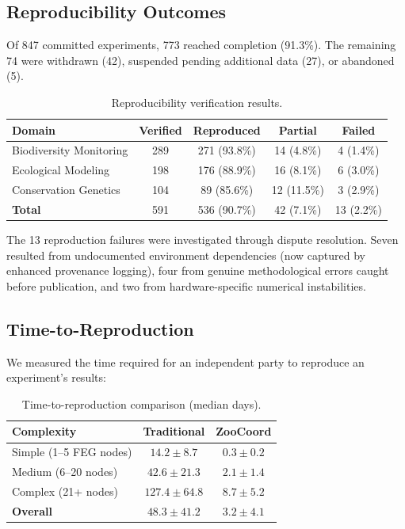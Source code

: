\documentclass[11pt,a4paper]{article}
\begin{document}
\subsection{Reproducibility Outcomes}

Of 847 committed experiments, 773 reached completion (91.3\%).
The remaining 74 were withdrawn (42), suspended pending additional data (27), or abandoned (5).

\begin{table}[H]
\centering
\caption{Reproducibility verification results.}
\label{tab:reproducibility}
\begin{tabular}{@{}lcccc@{}}
\toprule
\textbf{Domain} & \textbf{Verified} & \textbf{Reproduced} & \textbf{Partial} & \textbf{Failed} \\
\midrule
Biodiversity Monitoring & 289 & 271 (93.8\%) & 14 (4.8\%) & 4 (1.4\%) \\
Ecological Modeling & 198 & 176 (88.9\%) & 16 (8.1\%) & 6 (3.0\%) \\
Conservation Genetics & 104 & 89 (85.6\%) & 12 (11.5\%) & 3 (2.9\%) \\
\midrule
\textbf{Total} & 591 & 536 (90.7\%) & 42 (7.1\%) & 13 (2.2\%) \\
\bottomrule
\end{tabular}
\end{table}

The 13 reproduction failures were investigated through dispute resolution.
Seven resulted from undocumented environment dependencies (now captured by enhanced provenance logging), four from genuine methodological errors caught before publication, and two from hardware-specific numerical instabilities.

\subsection{Time-to-Reproduction}

We measured the time required for an independent party to reproduce an experiment's results:

\begin{table}[H]
\centering
\caption{Time-to-reproduction comparison (median days).}
\label{tab:time}
\begin{tabular}{@{}lcc@{}}
\toprule
\textbf{Complexity} & \textbf{Traditional} & \textbf{ZooCoord} \\
\midrule
Simple (1--5 FEG nodes) & $14.2 \pm 8.7$ & $0.3 \pm 0.2$ \\
Medium (6--20 nodes) & $42.6 \pm 21.3$ & $2.1 \pm 1.4$ \\
Complex (21+ nodes) & $127.4 \pm 64.8$ & $8.7 \pm 5.2$ \\
\midrule
\textbf{Overall} & $48.3 \pm 41.2$ & $3.2 \pm 4.1$ \\
\bottomrule
\end{tabular}
\end{table}
\end{document}
